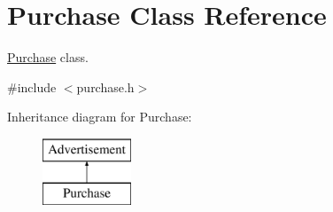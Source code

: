 \hypertarget{class_purchase}{}\section{Purchase Class Reference}
\label{class_purchase}


\hyperlink{class_purchase}{Purchase} class.  




{\ttfamily \#include $<$purchase.\+h$>$}

Inheritance diagram for Purchase\+:\begin{figure}[H]
\begin{center}
\leavevmode
\includegraphics[height=2.000000cm]{class_purchase}
\end{center}
\end{figure}
